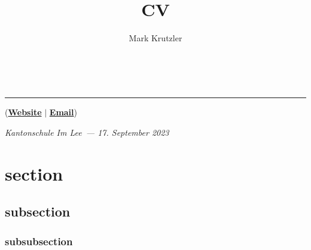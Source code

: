 \documentclass{article}
\title{CV}
\author{Mark Krutzler}
\makeatletter
\newcommand{\thesubtitle}{}
\newcommand{\currentdate}{17. September 2023}
\newcommand{\auemail}{mark.krutzler@icloud.com}
\newcommand{\auwebsite}{https://krutzler.xyz}
\newcommand{\auinstitution}{Kantonschule Im Lee}
\renewcommand{\maketitle}{
\begin{center}
{\Huge\bfseries
\thetitle}
\vspace{0.5em}\\
{\LARGE\thesubtitle}


{\rule{0.4\textwidth}{.4pt}}

{\bfseries \theauthor} (\href{\auwebsite}{\bfseries Website} $\vert$ \href{mailto:\auemail}{\bfseries Email})

\textit{\auinstitution \ --- \currentdate}
\end{center}
}
\makeatother
\begin{document}
\maketitle

\section{section}

\subsection{subsection}

\subsubsection{subsubsection}
\end{document}
